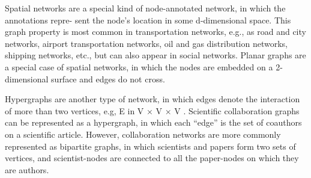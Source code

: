 Spatial networks are a special kind of node-annotated network, in which the annotations repre-
sent the node’s location in some d-dimensional space. This graph property is most common in
transportation networks, e.g., as road and city networks, airport transportation networks, oil and
gas distribution networks, shipping networks, etc., but can also appear in social networks. Planar
graphs are a special case of spatial networks, in which the nodes are embedded on a 2-dimensional
surface and edges do not cross.

Hypergraphs are another type of network, in which edges denote the interaction of more than two
vertices, e.g, E in V × V × V . Scientific collaboration graphs can be represented as a hypergraph,
in which each “edge” is the set of coauthors on a scientific article. However, collaboration networks
are more commonly represented as bipartite graphs, in which scientists and papers form two sets
of vertices, and scientist-nodes are connected to all the paper-nodes on which they are authors.


